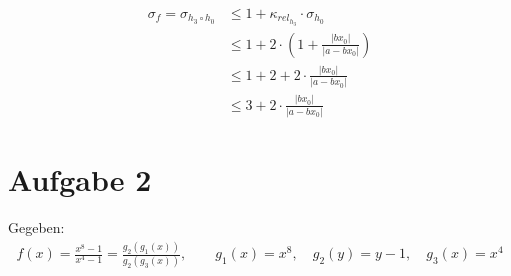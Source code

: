 \documentclass{llncs}
\begin{document}
\begin{align*}
\sigma_{f}=\sigma_{h_3\circ h_0}
&\le 1 + \kappa_{rel_{h_3}} \cdot \sigma_{h_0}\\
&\le 1 + 2 \cdot (1 + \frac{|bx_0|}{|a-bx_0|})\\
&\le 1 +  2 + 2 \cdot\frac{|bx_0|}{|a-bx_0|}\\
&\le 3 + 2 \cdot\frac{|bx_0|}{|a-bx_0|} 
\end{align*}
\newpage

\section*{Aufgabe 2}
Gegeben:
\begin{align*}
f(x)=\frac{x^8-1}{x^4-1}=\frac{g_2(g_1(x))}{g_2(g_3(x))} , \quad\quad
g_1(x)=x^8, \quad g_2(y)=y-1, \quad g_3(x)=x^4 
\end{align*}
\end{document}
